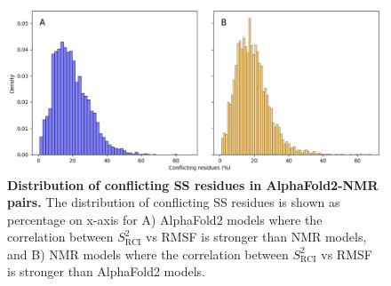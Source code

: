 \begin{figure}[H]
    \centering
    \includegraphics[width=\linewidth]{pLDDT//plddt_figures//supplementary_bhawna/supfig26.pdf}
    \caption{\textbf{Distribution of conflicting SS residues in AlphaFold2-NMR pairs.} The distribution of conflicting SS residues is shown as percentage on x-axis for A) AlphaFold2 models where the correlation between $S_{\text{RCI}}^{2}$ vs RMSF is stronger than NMR models, and B) NMR models where the correlation between $S_{\text{RCI}}^{2}$ vs RMSF is stronger than AlphaFold2 models.}
    \label{fig:plddt_sup:sup26}
\end{figure}


